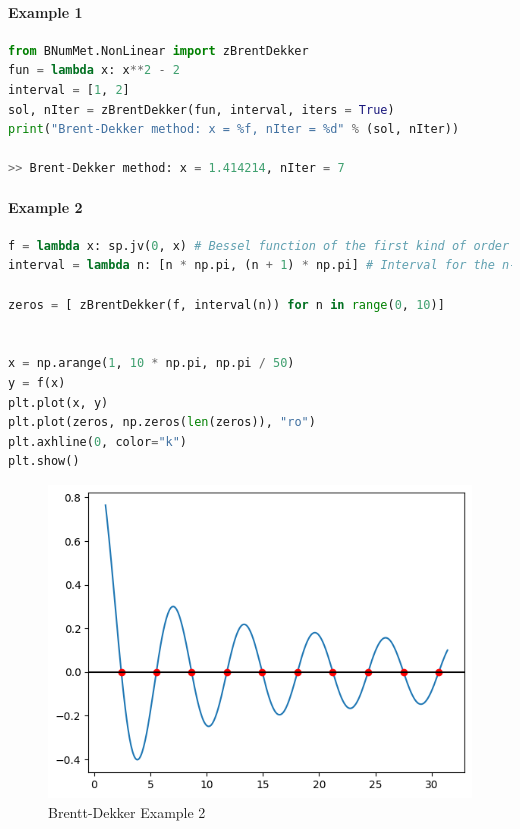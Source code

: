 \paragraph{Example 1}{
\begin{lstlisting}[language=Python]
from BNumMet.NonLinear import zBrentDekker
fun = lambda x: x**2 - 2
interval = [1, 2]
sol, nIter = zBrentDekker(fun, interval, iters = True)
print("Brent-Dekker method: x = %f, nIter = %d" % (sol, nIter))

>> Brent-Dekker method: x = 1.414214, nIter = 7
\end{lstlisting}
}
\paragraph{Example 2}{
\begin{lstlisting}[language=Python]
f = lambda x: sp.jv(0, x) # Bessel function of the first kind of order 0
interval = lambda n: [n * np.pi, (n + 1) * np.pi] # Interval for the n-th zero

zeros = [ zBrentDekker(f, interval(n)) for n in range(0, 10)]


x = np.arange(1, 10 * np.pi, np.pi / 50)
y = f(x)
plt.plot(x, y)
plt.plot(zeros, np.zeros(len(zeros)), "ro")
plt.axhline(0, color="k")
plt.show()
\end{lstlisting}
\begin{figure}[H]
    \centering
    \includegraphics{Include/Images/Thesis/Documentation/NonLinear/Brentt-Dekker Example 2.png}
    \caption{Brentt-Dekker Example 2}
    \label{fig:Brentt-Dekker Example 2}
\end{figure}
}